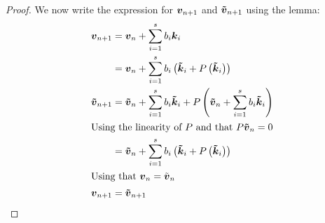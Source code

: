 \begin{proof}
We now write the expression for ${\boldsymbol {v}}_{n+1}$ and ${\boldsymbol {\tilde{v}}}_{n+1}$ using the lemma:
\begin{align*}
{\boldsymbol {v}}_{n+1}&={\boldsymbol {v}}_{n}+\sum_{i=1}^{s}b_{i}{\boldsymbol {k}}_{i}\\
&={\boldsymbol {v}}_{n}+\sum_{i=1}^{s}b_{i}\left({\boldsymbol {\tilde{k}}}_{i}+P\left({\boldsymbol {\tilde{k}}}_{i}\right)\right)\\
{\boldsymbol {\tilde{v}}}_{n+1}&={\boldsymbol {\tilde{v}}}_{n}+\sum_{i=1}^{s}b_{i}{\boldsymbol {\tilde{k}}}_{i}+P\left({\boldsymbol {\tilde{v}}}_{n}+\sum_{i=1}^{s}b_{i}{\boldsymbol {\tilde{k}}}_{i}\right)\\
\intertext{Using the linearity of $P$ and that $P{\boldsymbol {\tilde{v}}}_{n}=0$}
&={\boldsymbol {\tilde{v}}}_{n}+\sum_{i=1}^{s}b_{i}\left({\boldsymbol {\tilde{k}}}_{i}+P\left({\boldsymbol {\tilde{k}}}_{i}\right)\right)\\
\intertext{Using that ${\boldsymbol {v}}_{n}=\tilde{{\boldsymbol {v}}}_{n}$}
{\boldsymbol {v}}_{n+1}&={\boldsymbol {\tilde{v}}}_{n+1}
\end{align*}

\end{proof}


